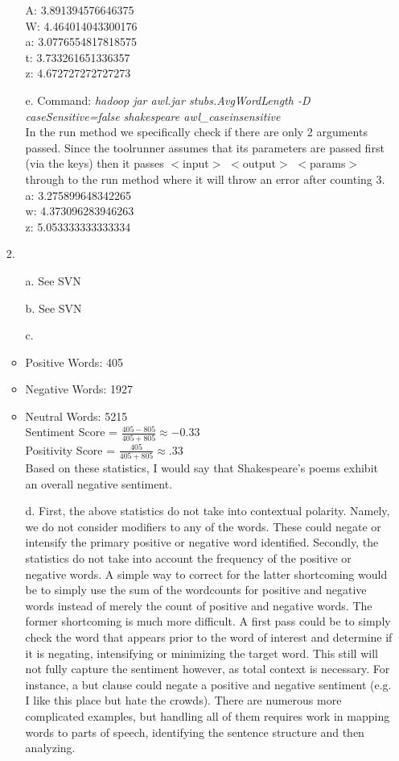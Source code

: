 \documentclass{article}
\begin{document}
\begin{itemize}
\begin{itemize}
		A: 3.891394576646375\\
		W: 4.464014043300176\\
		a: 3.0776554817818575\\
		t: 3.733261651336357\\
		z: 4.672727272727273\\
	\item[e.] 
		Command: \textit{hadoop jar awl.jar stubs.AvgWordLength -D caseSensitive=false shakespeare awl\_caseinsensitive} \\
		In the run method we specifically check if there are only 2 arguments passed. Since the toolrunner assumes that its parameters are passed first (via the keys) then it passes $<$input$>$ $<$output$>$ $<$params$>$ through to the run method where it will throw an error after counting 3.\\
		a: 3.275899648342265\\
		w: 4.373096283946263\\
		z: 5.053333333333334\\
	\end{itemize}
	
\pagebreak

\item[2.]
	\begin{itemize}
	\item[a.] See SVN
	\item[b.] See SVN
	\item[c.] 
		\item Positive Words: 405
		\item Negative Words: 1927
		\item Neutral Words: 5215\\	
		Sentiment Score = $\frac{405-805}{405+805} \approx -0.33$ \\
		Positivity Score = $\frac{405}{405+805} \approx .33$ \\
		Based on these statistics, I would say that Shakespeare's poems exhibit an overall negative sentiment.
	\item[d.] First, the above statistics do not take into contextual polarity. Namely, we do not consider modifiers to any of the words. These could negate or intensify the primary positive or negative word identified. Secondly, the statistics do not take into account the frequency of the positive or negative words. A simple way to correct for the latter shortcoming would be to simply use the sum of the wordcounts for positive and negative words instead of merely the count of positive and negative words. The former shortcoming is much more difficult. A first pass could be to simply check the word that appears prior to the word of interest and determine if it is negating, intensifying or minimizing the target word. This still will not fully capture the sentiment however, as total context is necessary. For instance, a but clause could negate a positive and negative sentiment (e.g. I like this place but hate the crowds). There are numerous more complicated examples, but handling all of them requires work in mapping words to parts of speech, identifying the sentence structure and then analyzing.
	

\end{itemize}
\end{itemize}
\end{document}
